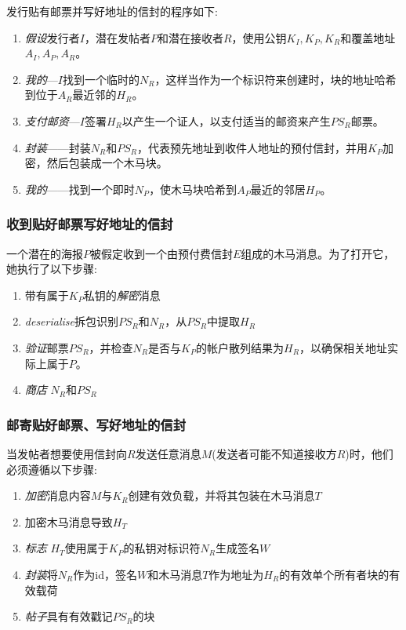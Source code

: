 发行贴有邮票并写好地址的信封的程序如下:

\begin{enumerate}
\item \emph{假设}发行者$I$，潜在发帖者$P$和潜在接收者$R$，使用公钥$K_I, K_P, K_R$和覆盖地址$A_I, A_P, A_R$。
\item \emph{我的}—$I$找到一个临时的$N_R$，这样当作为一个标识符来创建时，块的地址哈希到位于$A_R$最近邻的$H_R$。
\item \emph{支付邮资}—$I$签署$H_R$以产生一个证人，以支付适当的邮资来产生$PS_R$邮票。
\item \emph{封装}——封装$N_R$和$PS_R$，代表预先地址到收件人地址的预付信封，并用$K_P$加密，然后包装成一个木马块。
\item \emph{我的}——找到一个即时$N_P$，使木马块哈希到$A_P$最近的邻居$H_P$。 
\end{enumerate}




\subsubsection{收到贴好邮票写好地址的信封}

一个潜在的海报$P$被假定收到一个由预付费信封$E$组成的木马消息。为了打开它，她执行了以下步骤:

\begin{enumerate}
    \item 带有属于$K_P$私钥的\emph{解密}消息
    \item \emph{deserialise}拆包识别$PS_R$和$N_R$，从$PS_R$中提取$H_R$
    \item \emph{验证}邮票$PS_R$，并检查$N_R$是否与$K_P$的帐户散列结果为$H_R$，以确保相关地址实际上属于$P$。
    \item \emph{商店} $N_R$和$PS_R$ 
\end{enumerate}

\subsubsection{邮寄贴好邮票、写好地址的信封}

当发帖者想要使用信封向$R$发送任意消息$M$(发送者可能不知道接收方$R$)时，他们必须遵循以下步骤:

\begin{enumerate}
\item \emph{加密}消息内容$M$与$K_R$创建有效负载，并将其包装在木马消息$T$
\item 加密木马消息导致$H_T$
\item \emph{标志} $H_T$使用属于$K_P$的私钥对标识符$N_R$生成签名$W$
\item \emph{封装}将$N_R$作为id，签名$W$和木马消息$T$作为地址为$H_R$的有效单个所有者块的有效载荷
\item \emph{帖子}具有有效戳记$PS_R$的块
\end{enumerate}

